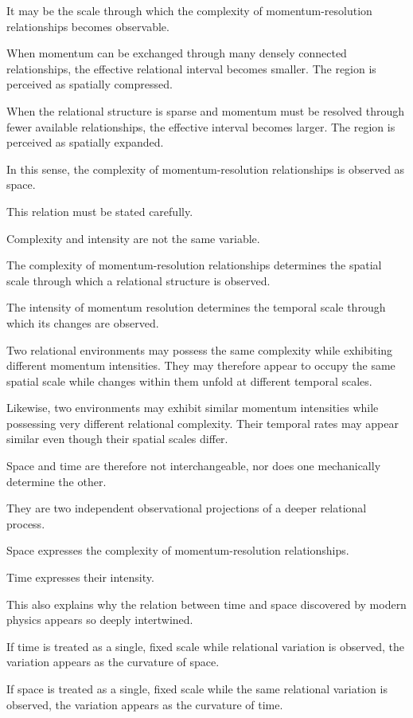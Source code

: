 It may be the scale through which the complexity of momentum-resolution relationships becomes observable.

When momentum can be exchanged through many densely connected relationships, the effective relational interval becomes smaller. The region is perceived as spatially compressed.

When the relational structure is sparse and momentum must be resolved through fewer available relationships, the effective interval becomes larger. The region is perceived as spatially expanded.

In this sense, the complexity of momentum-resolution relationships is observed as space.

This relation must be stated carefully.

Complexity and intensity are not the same variable.

The complexity of momentum-resolution relationships determines the spatial scale through which a relational structure is observed.

The intensity of momentum resolution determines the temporal scale through which its changes are observed.

Two relational environments may possess the same complexity while exhibiting different momentum intensities. They may therefore appear to occupy the same spatial scale while changes within them unfold at different temporal scales.

Likewise, two environments may exhibit similar momentum intensities while possessing very different relational complexity. Their temporal rates may appear similar even though their spatial scales differ.

Space and time are therefore not interchangeable, nor does one mechanically determine the other.

They are two independent observational projections of a deeper relational process.

Space expresses the complexity of momentum-resolution relationships.

Time expresses their intensity.

This also explains why the relation between time and space discovered by modern physics appears so deeply intertwined.

If time is treated as a single, fixed scale while relational variation is observed, the variation appears as the curvature of space.

If space is treated as a single, fixed scale while the same relational variation is observed, the variation appears as the curvature of time.

